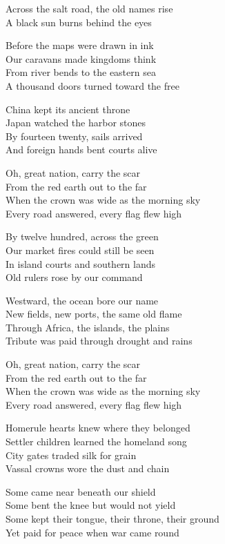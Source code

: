 \begin{lyrics}
Across the salt road, the old names rise\\
A black sun burns behind the eyes

Before the maps were drawn in ink\\
Our caravans made kingdoms think\\
From river bends to the eastern sea\\
A thousand doors turned toward the free

China kept its ancient throne\\
Japan watched the harbor stones\\
By fourteen twenty, sails arrived\\
And foreign hands bent courts alive

Oh, great nation, carry the scar\\
From the red earth out to the far\\
When the crown was wide as the morning sky\\
Every road answered, every flag flew high

By twelve hundred, across the green\\
Our market fires could still be seen\\
In island courts and southern lands\\
Old rulers rose by our command

Westward, the ocean bore our name\\
New fields, new ports, the same old flame\\
Through Africa, the islands, the plains\\
Tribute was paid through drought and rains

Oh, great nation, carry the scar\\
From the red earth out to the far\\
When the crown was wide as the morning sky\\
Every road answered, every flag flew high

Homerule hearts knew where they belonged\\
Settler children learned the homeland song\\
City gates traded silk for grain\\
Vassal crowns wore the dust and chain

Some came near beneath our shield\\
Some bent the knee but would not yield\\
Some kept their tongue, their throne, their ground\\
Yet paid for peace when war came round


\end{lyrics}
